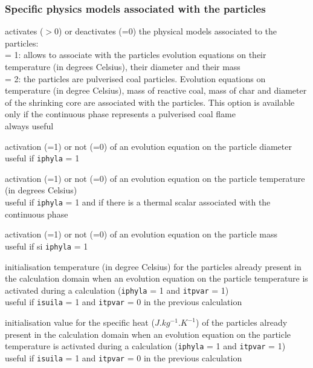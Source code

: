 \subsubsection{Specific physics models associated with the particles}

{activates ($>$0) or deactivates (=0) the physical models associated to the
particles:\\
\hspace*{1.3cm} = 1: allows to associate with the particles evolution
equations on their temperature (in degrees Celsius), their diameter and
their mass\\
\hspace*{1.3cm} = 2: the particles are pulverised coal particles.
Evolution equations on temperature (in degree Celsius), mass of
reactive coal, mass of char and diameter of the shrinking core are
associated with the particles. This option is available only if the
continuous phase represents a pulverised coal flame\\
always useful}

{activation (=1) or not (=0) of an evolution equation on the particle
diameter\\
useful if \texttt{iphyla} = 1}

{activation (=1) or not (=0) of an evolution equation on the particle
temperature (in degrees Celsius)\\
useful if \texttt{iphyla} = 1 and if there is a thermal scalar associated with
the continuous phase}

{activation (=1) or not (=0) of an evolution equation on the
particle mass\\
useful if si \texttt{iphyla} = 1}

{initialisation temperature (in degree Celsius) for the particles already
present in the calculation domain when an evolution equation on
the particle temperature is activated during a calculation (\texttt{iphyla} =
1 and \texttt{itpvar} = 1)\\
useful if \texttt{isuila} = 1 and \texttt{itpvar} = 0 in the previous
calculation}

{initialisation value for the specific heat ($J.kg^{-1}.K^{-1}$) of the
particles already present in the calculation domain when an evolution equation
on the particle temperature is activated during a calculation
(\texttt{iphyla} = 1 and \texttt{itpvar} = 1)\\
useful if \texttt{isuila} = 1 and \texttt{itpvar} = 0 in the previous calculation}

